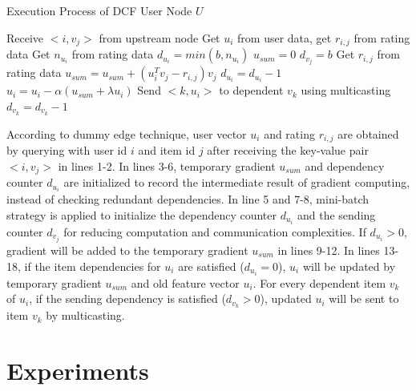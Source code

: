 \documentclass{llncs}
\begin{document}
\begin{algorithm}
\caption{Execution Process of DCF User Node $U$}
\label{code:DCF}
\begin{algorithmic}[1]
\STATE Receive $<i, v_j>$ from upstream node
\STATE Get $u_i$ from user data, get $r_{i,j}$ from rating data
\STATE Get $n_{u_i}$ from rating data
\STATE $d_{u_i} = min(b,n_{u_i})$
\STATE $u_{sum} = 0$
\ENDIF
{}
\STATE $d_{v_j} = b$
\ENDIF
{}
\STATE Get $r_{i,j}$ from rating data
\STATE $u_{sum} = u_{sum} + (u_i^T v_j - r_{i,j})v_j$
\STATE $d_{u_i} = d_{u_i} - 1$
\ENDIF
{}
\STATE $u_i = u_i - \alpha (u_{sum} + \lambda u_i)$
\STATE Send $<k, u_i>$ to dependent $v_k$ using multicasting
\STATE $d_{v_k} = d_{v_k} - 1$
\ENDIF
\ENDFOR
\ENDIF
\end{algorithmic}
\end{algorithm}

According to dummy edge technique, user vector $u_i$ and rating $r_{i,j}$ are obtained by querying with user id $i$ and item id $j$ after receiving the key-value pair $<i, v_j>$ in lines 1-2. In lines 3-6, temporary gradient $u_{sum}$ and dependency counter $d_{u_i}$ are initialized to record the intermediate result of gradient computing, instead of checking redundant dependencies. In line 5 and 7-8, mini-batch strategy is applied to initialize the dependency counter $d_{u_i}$ and the sending counter $d_{v_j}$ for reducing computation and communication complexities. If $d_{u_i} > 0$, gradient will be added to the temporary gradient $u_{sum}$ in lines 9-12. In lines 13-18, if the item dependencies for $u_i$ are satisfied ($d_{u_i} = 0$), $u_i$ will be updated by temporary gradient $u_{sum}$ and old feature vector $u_i$. For every dependent item $v_k$ of $u_i$, if the sending dependency is satisfied ($d_{v_k} > 0$), updated $u_i$ will be sent to item $v_k$ by multicasting.
%
\vspace{-10pt}
\section{Experiments}
\label{sec:experiment}
\vspace{-5pt}
\end{document}
